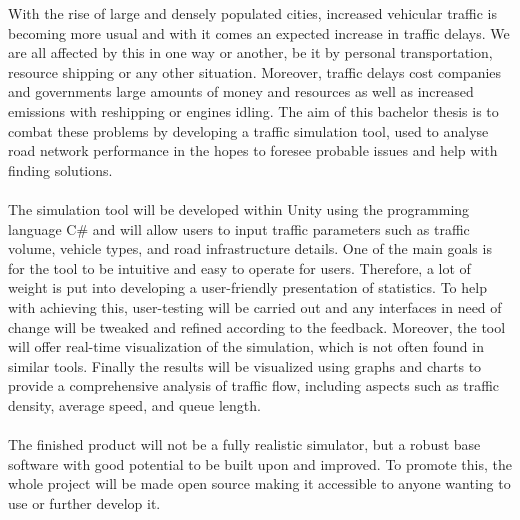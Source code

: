     With the rise of large and densely populated cities, increased vehicular traffic is becoming more usual and with it comes an expected increase in traffic delays. We are all affected by this in one way or another, be it by personal transportation, resource shipping or any other situation. Moreover, traffic delays cost companies and governments large amounts of money and resources as well as increased emissions with reshipping or engines idling. The aim of this bachelor thesis is to combat these problems by developing a traffic simulation tool, used to analyse road network performance in the hopes to foresee probable issues and help with finding solutions.
    \\\\
    The simulation tool will be developed within Unity using the programming language C\# and will allow users to input traffic parameters such as traffic volume, vehicle types, and road infrastructure details. One of the main goals is for the tool to be intuitive and easy to operate for users. Therefore, a lot of weight is put into developing a user-friendly presentation of statistics. To help with achieving this, user-testing will be carried out and any interfaces in need of change will be tweaked and refined according to the feedback. Moreover, the tool will offer real-time visualization of the simulation, which is not often found in similar tools. Finally the results will be visualized using graphs and charts to provide a comprehensive analysis of traffic flow, including aspects such as traffic density, average speed, and queue length.
    \\\\
    The finished product will not be a fully realistic simulator, but a robust base software with good potential to be built upon and improved. To promote this, the whole project will be made open source making it accessible to anyone wanting to use or further develop it.

\newpage

